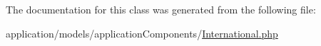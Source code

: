 The documentation for this class was generated from the following file\-:\begin{DoxyCompactItemize}
\item 
application/models/application\-Components/\hyperlink{_international_8php}{International.\-php}\end{DoxyCompactItemize}

